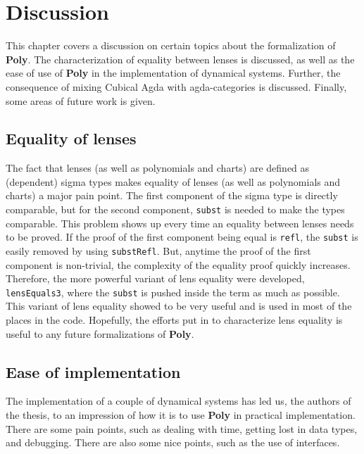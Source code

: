 \chapter{Discussion}\label{chapter:discussion}
This chapter covers a discussion on certain topics about the formalization of \textbf{Poly}. The characterization of equality between lenses is discussed, as well as the ease of use of \textbf{Poly} in the implementation of dynamical systems. Further, the consequence of mixing Cubical Agda with agda-categories is discussed. Finally, some areas of future work is given.

\section{Equality of lenses}
The fact that lenses (as well as polynomials and charts) are defined as (dependent) sigma types makes equality of lenses (as well as polynomials and charts) a major pain point. The first component of the sigma type is directly comparable, but for the second component, \texttt{subst} is needed to make the types comparable. This problem shows up every time an equality between lenses needs to be proved. If the proof of the first component being equal is \texttt{refl}, the \texttt{subst} is easily removed by using \texttt{substRefl}. But, anytime the proof of the first component is non-trivial, the complexity of the equality proof quickly increases. Therefore, the more powerful variant of lens equality were developed, \texttt{lensEquals3}, where the \texttt{subst} is pushed inside the term as much as possible. This variant of lens equality showed to be very useful and is used in most of the places in the code. Hopefully, the efforts put in to characterize lens equality is useful to any future formalizations of \textbf{Poly}.


\section{Ease of implementation}
The implementation of a couple of dynamical systems has led us, the authors of the thesis, to an impression of how it is to use \textbf{Poly} in practical implementation. There are some pain points, such as dealing with time, getting lost in data types, and debugging. There are also some nice points, such as the use of interfaces. %

